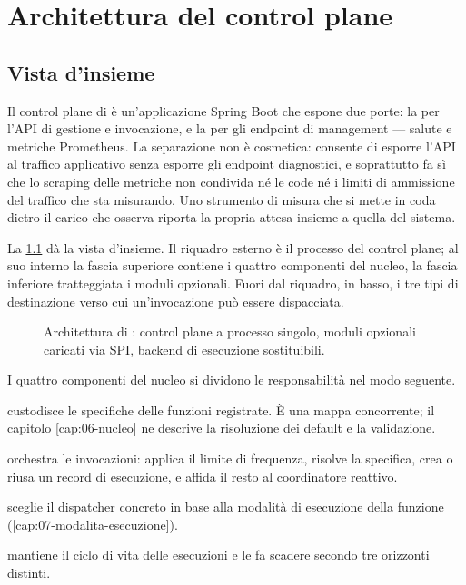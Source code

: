 \chapter{Architettura del control plane}
\label{cap:04-architettura-control-plane}

\section{Vista d'insieme}

Il control plane di \nf{} \`e un'applicazione Spring Boot che espone due porte:
la  per l'API di gestione e invocazione, e la  per gli
endpoint di management --- salute e metriche Prometheus. La separazione non \`e
cosmetica: consente di esporre l'API al traffico applicativo senza esporre gli
endpoint diagnostici, e soprattutto fa s\`i che lo scraping delle metriche non
condivida n\'e le code n\'e i limiti di ammissione del traffico che sta
misurando. Uno strumento di misura che si mette in coda dietro il carico che
osserva riporta la propria attesa insieme a quella del sistema.

La \cref{fig:architettura} d\`a la vista d'insieme. Il riquadro esterno \`e il
processo del control plane; al suo interno la fascia superiore contiene i quattro
componenti del nucleo, la fascia inferiore tratteggiata i moduli opzionali. Fuori
dal riquadro, in basso, i tre tipi di destinazione verso cui un'invocazione pu\`o
essere dispacciata.

\begin{figure}[htbp]
  \centering
  \resizebox{0.95\textwidth}{!}{}
  \caption{Architettura di \nf{}: control plane a processo singolo, moduli
  opzionali caricati via SPI, backend di esecuzione sostituibili.}
  \label{fig:architettura}
\end{figure}

I quattro componenti del nucleo si dividono le responsabilit\`a nel modo
seguente.

\begin{description}[style=nextline, leftmargin=0pt]
  \item[\code{FunctionRegistry}] custodisce le specifiche delle funzioni
  registrate. \`E una mappa concorrente; il capitolo \cref{cap:06-nucleo} ne
  descrive la risoluzione dei default e la validazione.

  \item[\code{InvocationService}] orchestra le invocazioni: applica il limite di
  frequenza, risolve la specifica, crea o riusa un record di esecuzione, e
  affida il resto al coordinatore reattivo.

  \item[\code{DispatcherRouter}] sceglie il dispatcher concreto in base alla
  modalit\`a di esecuzione della funzione (\cref{cap:07-modalita-esecuzione}).

  \item[\code{ExecutionStore}] mantiene il ciclo di vita delle esecuzioni e le
  fa scadere secondo tre orizzonti distinti.
\end{description}

